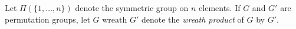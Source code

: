 Let $\Pi(\{1, \ldots, n\})$ denote the symmetric group on $n$ elements. If $G$ and $G'$ are permutation groups, let $G \text{ wreath } G'$ denote the \emph{wreath product} of $G$ by $G'$.
